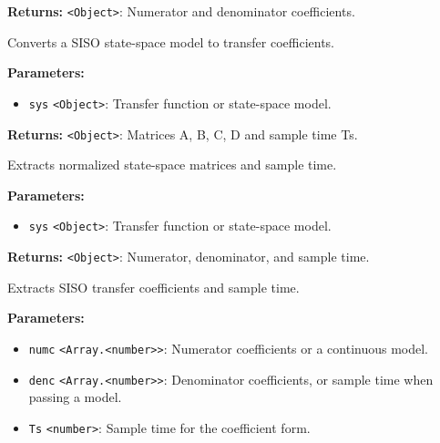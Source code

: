 \documentclass[12pt,a4paper]{article}
\begin{document}
\noindent \textbf{Returns:} \texttt{<Object>}: Numerator and denominator coefficients.

\noindent Converts a SISO state-space model to transfer coefficients.

\vspace{5mm}
\noindent {}


\noindent \textbf{Parameters:}
\begin{itemize}
  \item \texttt{sys} \texttt{<Object>}: Transfer function or state-space model.
\end{itemize}

\noindent \textbf{Returns:} \texttt{<Object>}: Matrices A, B, C, D and sample time Ts.

\noindent Extracts normalized state-space matrices and sample time.

\vspace{5mm}
\noindent {}


\noindent \textbf{Parameters:}
\begin{itemize}
  \item \texttt{sys} \texttt{<Object>}: Transfer function or state-space model.
\end{itemize}

\noindent \textbf{Returns:} \texttt{<Object>}: Numerator, denominator, and sample time.

\noindent Extracts SISO transfer coefficients and sample time.

\vspace{5mm}
\noindent {}


\noindent \textbf{Parameters:}
\begin{itemize}
  \item \texttt{numc} \texttt{<Array.<number>>}: Numerator coefficients or a continuous model.
  \item \texttt{denc} \texttt{<Array.<number>>}: Denominator coefficients, or sample time when passing a model.
  \item \texttt{Ts} \texttt{<number>}: Sample time for the coefficient form.
\end{itemize}
\end{document}

